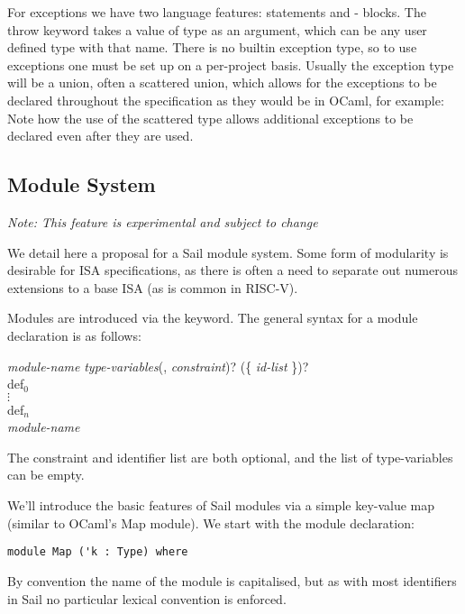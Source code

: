 For exceptions we have two language features:  statements
and - blocks. The throw keyword takes a value of
type  as an argument, which can be any user defined type
with that name. There is no builtin exception type, so to use
exceptions one must be set up on a per-project basis. Usually the
exception type will be a union, often a scattered union, which allows
for the exceptions to be declared throughout the specification as they
would be in OCaml, for example: 
Note how the use of the scattered type allows additional exceptions to
be declared even after they are used.

\newpage
\subsection{Module System}
\label{sec:modules}

\noindent \emph{Note: This feature is experimental and subject to change}

We detail here a proposal for a Sail module system. Some form of
modularity is desirable for ISA specifications, as there is often a
need to separate out numerous extensions to a base ISA (as is common in
RISC-V).

Modules are introduced via the  keyword. The general syntax
for a module declaration is as follows:
\begin{center}
   \textit{module-name} \textit{type-variables}(, \textit{constraint})? (\{ \textit{id-list} \})? \\
  def$_0$\\
  $\vdots$\\
  def$_n$\\
   \textit{module-name}
\end{center}
The constraint and identifier list are both optional, and the list of
type-variables can be empty.

We'll introduce the basic features of Sail modules via a simple
key-value map (similar to OCaml's Map module). We start with the
module declaration:
\begin{lstlisting}
module Map ('k : Type) where
\end{lstlisting}
By convention the name of the module is capitalised, but as with most
identifiers in Sail no particular lexical convention is enforced.

